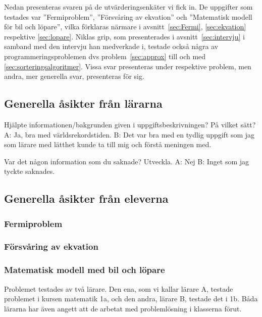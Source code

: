 \textcolor{lila}{Nedan presenteras svaren på de utvärderingsenkäter vi fick in. De uppgifter som testades var ''Fermiproblem'', ''Försvåring av ekvation'' och ''Matematisk modell för bil och löpare'', vilka förklaras närmare i avsnitt~\ref{sec:Fermi}, \ref{sec:ekvation} respektive \ref{sec:lopare}. Niklas grip, som presenterades i avsnitt~\ref{sec:intervju} i samband med den intervju han medverkade i, testade också några av programmeringsproblemen dvs problem~\ref{sec:approx} till och med \ref{sec:sorteringsalgoritmer}. Vissa svar presenteras under respektive problem, men andra, mer generella svar, presenteras för sig.}

\subsection{Generella åsikter från lärarna}

Hjälpte informationen/bakgrunden given i uppgiftsbeskrivningen? På vilket sätt?
A: Ja, bra med världsrekordstiden.
B: Det var bra med en tydlig uppgift som jag som lärare med lätthet kunde ta till mig och förstå meningen med.

Var det någon information som du saknade? Utveckla.
A: Nej
B: Inget som jag tyckte saknades.


\subsection{Generella åsikter från eleverna}

\subsubsection{Fermiproblem}
    \label{resultat:Fermi}

\subsubsection{Försvåring av ekvation}
    \label{resultat:Ekvation}

\subsubsection{Matematisk modell med bil och löpare}
    \label{resultat:Lopare}
    
    \textcolor{lila}{Problemet testades av två lärare. Den ena, som vi kallar lärare A, testade problemet i kursen matematik 1a, och den andra, lärare B, testade det i 1b. Båda lärarna har även angett att de arbetat med problemlösning i klasserna förut.}
    
